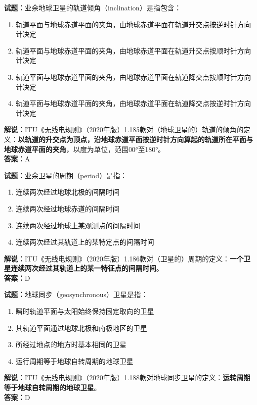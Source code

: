 \documentclass{ctexbook}
\begin{document}
\noindent\textbf{试题：}业余地球卫星的轨道倾角（inclination）是指包含：
\begin{enumerate}[leftmargin=3em]
  \item 轨道平面与地球赤道平面的夹角，由地球赤道平面在轨道升交点按逆时针方向计决定
  \item 轨道平面与地球赤道平面的夹角，由地球赤道平面在轨道升交点按顺时针方向计决定
  \item 轨道平面与地球赤道平面的夹角，由地球赤道平面在轨道降交点按顺时针方向计决定
  \item 轨道平面与地球赤道平面的夹角，由地球赤道平面在轨道降交点按逆时针方向计决定
\end{enumerate}
\noindent\textbf{解说：}ITU《无线电规则》（2020年版）1.185款对（地球卫星的）轨道的倾角的定义：\textbf{以轨道的升交点为顶点，沿地球赤道平面按逆时针方向算起的轨道所在平面与地球赤道平面的夹角}，以度为单位，范围\ang{00;;}至\ang{180;;}。\\\noindent\textbf{答案：}A

\vspace{\baselineskip}

\noindent\textbf{试题：}业余卫星的周期（period）是指：
\begin{enumerate}[leftmargin=3em]
  \item 连续两次经过地球北极的间隔时间
  \item 连续两次经过地球赤道的间隔时间
  \item 连续两次经过地球上某观测点的间隔时间
  \item 连续两次经过其轨道上的某特定点的间隔时间
\end{enumerate}
\noindent\textbf{解说：}ITU《无线电规则》（2020年版）1.186款对（卫星的）周期的定义：\textbf{一个卫星连续两次经过其轨道上的某一特征点的间隔时间}。\\\noindent\textbf{答案：}D

\vspace{\baselineskip}

\noindent\textbf{试题：}地球同步（geosynchronous）卫星是指：
\begin{enumerate}[leftmargin=3em]
  \item 瞬时轨道平面与太阳始终保持固定取向的卫星
  \item 其轨道平面通过地球北极和南极地区的卫星
  \item 所经过地点的地方时基本相同的卫星
  \item 运行周期等于地球自转周期的地球卫星
\end{enumerate}
\noindent\textbf{解说：}ITU《无线电规则》（2020年版）1.188款对地球同步卫星的定义：\textbf{运转周期等于地球自转周期的地球卫星}。\\\noindent\textbf{答案：}D
\end{document}
